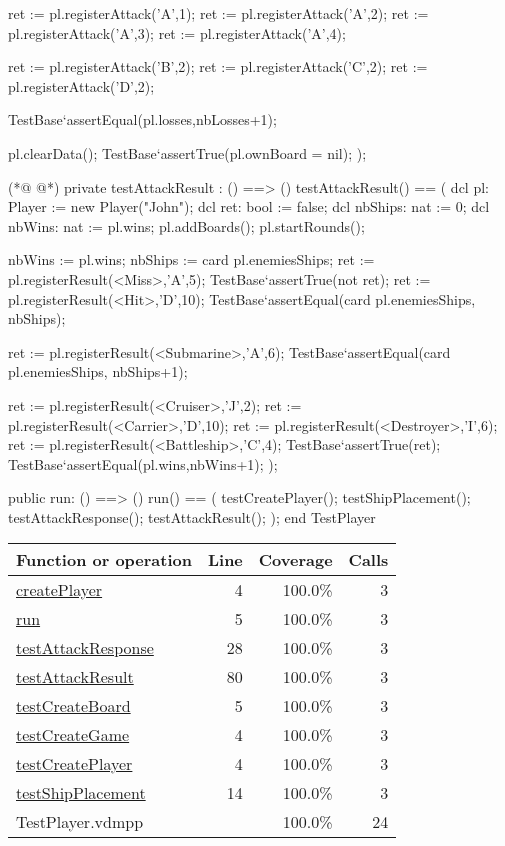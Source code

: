 \begin{vdmpp}[breaklines=true]
   ret := pl.registerAttack('A',1);
   ret := pl.registerAttack('A',2);
    ret := pl.registerAttack('A',3);
   ret := pl.registerAttack('A',4);
   
   ret := pl.registerAttack('B',2);
   ret := pl.registerAttack('C',2);
   ret := pl.registerAttack('D',2);
   
   TestBase`assertEqual(pl.losses,nbLosses+1);
   
   pl.clearData();
   TestBase`assertTrue(pl.ownBoard = nil);
 );
 
(*@
\label{testAttackResult:80}
@*)
 private testAttackResult : () ==> ()
  testAttackResult() == (
   dcl pl: Player := new Player("John");
   dcl ret: bool := false;
   dcl nbShips: nat := 0;
   dcl nbWins: nat := pl.wins;
   pl.addBoards();
   pl.startRounds();
   
   nbWins := pl.wins;
   nbShips := card pl.enemiesShips;
   ret := pl.registerResult(<Miss>,'A',5);
   TestBase`assertTrue(not ret);
   ret := pl.registerResult(<Hit>,'D',10);
   TestBase`assertEqual(card pl.enemiesShips, nbShips);
   
   ret := pl.registerResult(<Submarine>,'A',6);
   TestBase`assertEqual(card pl.enemiesShips, nbShips+1);
   
   ret := pl.registerResult(<Cruiser>,'J',2);
   ret := pl.registerResult(<Carrier>,'D',10);
   ret := pl.registerResult(<Destroyer>,'I',6);
   ret := pl.registerResult(<Battleship>,'C',4);
   TestBase`assertTrue(ret);
   TestBase`assertEqual(pl.wins,nbWins+1);
 );
 
 public run: () ==> ()
  run() == (
   testCreatePlayer();
   testShipPlacement();
   testAttackResponse();
   testAttackResult();
 );
end TestPlayer
\end{vdmpp}
\bigskip
\begin{longtable}{|l|r|r|r|}
\hline
Function or operation & Line & Coverage & Calls \\
\hline
\hline
\hyperref[createPlayer:4]{createPlayer} & 4&100.0\% & 3 \\
\hline
\hyperref[run:5]{run} & 5&100.0\% & 3 \\
\hline
\hyperref[testAttackResponse:28]{testAttackResponse} & 28&100.0\% & 3 \\
\hline
\hyperref[testAttackResult:80]{testAttackResult} & 80&100.0\% & 3 \\
\hline
\hyperref[testCreateBoard:5]{testCreateBoard} & 5&100.0\% & 3 \\
\hline
\hyperref[testCreateGame:4]{testCreateGame} & 4&100.0\% & 3 \\
\hline
\hyperref[testCreatePlayer:4]{testCreatePlayer} & 4&100.0\% & 3 \\
\hline
\hyperref[testShipPlacement:14]{testShipPlacement} & 14&100.0\% & 3 \\
\hline
\hline
TestPlayer.vdmpp & & 100.0\% & 24 \\
\hline
\end{longtable}

